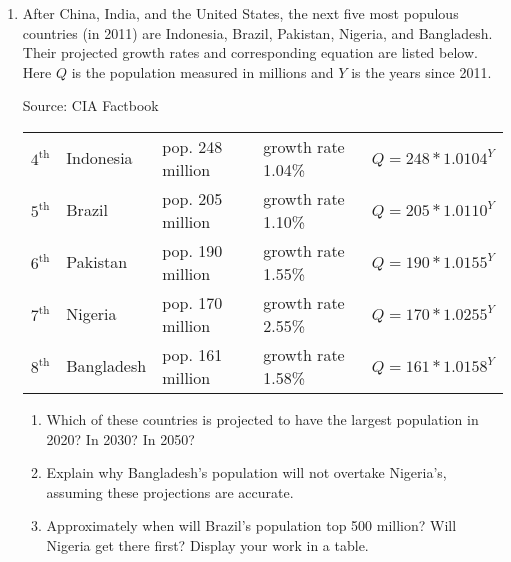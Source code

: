 \begin{enumerate}
\newpage %

\item After China, India, and the United States, the next five most populous countries (in 2011) are Indonesia, Brazil, Pakistan, Nigeria, and Bangladesh.  Their projected growth rates and corresponding equation are listed below.  Here $Q$ is the population measured in millions  and $Y$ is the years since 2011. \hfill \begin{footnotesize} Source:  CIA Factbook \end{footnotesize}
\vspace{-.25in} %

\begin{center}
\begin{tabular} {lllll}
$4^{\text{th}}$ & Indonesia \quad ~& pop. 248 million \quad ~& growth rate 1.04\% \quad ~& $Q= 248 \ast 1.0104^Y$\\
$5^{\text{th}}$ & Brazil & pop. 205 million & growth rate 1.10\%& $Q = 205  \ast 1.0110^Y$\\
$6^{\text{th}}$ & Pakistan & pop. 190  million & growth rate 1.55\% & $Q = 190 \ast 1.0155^Y$\\
$7^{\text{th}}$& Nigeria & pop. 170  million & growth rate 2.55\% & $Q = 170 \ast 1.0255^Y$\\
$8^{\text{th}}$ & Bangladesh & pop. 161  million & growth rate 1.58\% & $Q = 161\ast 1.0158^Y$\\
\end{tabular}
\end{center}
\begin{enumerate}
\item Which of these countries is projected to have the largest population in 2020?  In 2030?  In 2050? \vfill \vfill
\item Explain why Bangladesh's population will not overtake Nigeria's, assuming these projections are accurate. \vfill
\item Approximately when will Brazil's population top 500 million?  Will Nigeria get there first?  Display your work in a table. \vfill \vfill
\end{enumerate}

\end{enumerate}




